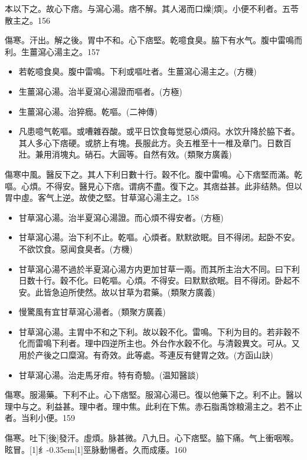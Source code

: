 \documentclass[11pt,oneside,b5paper]{ctexbook}
\begin{document}
\begin{flushleft}
本以下之。故心下痞。与瀉心湯。痞不解。其人渴而口燥[煩]。小便不利者。五苓散主之。156

傷寒。汗出。解之後。胃中不和。心下痞堅。乾噫食臭。脇下有水气。腹中雷鳴而利。生薑瀉心湯主之。157

\begin{itemize}
\item 若乾噫食臭。腹中雷鳴。下利或嘔吐者。生薑瀉心湯主之。(方機)
\item 生薑瀉心湯。治半夏瀉心湯證而嘔者。(方極)
\item 生薑瀉心湯。治猝癇。乾嘔。(二神傳)
\item 凡患噫气乾嘔。或嘈雜吞酸。或平日饮食每觉惡心煩闷。水饮升降於脇下者。其人多心下痞硬。或脐上有塊。長服此方。灸五椎至十一椎及章门。日数百壯。兼用消塊丸。硝石。大圓等。自然有效。(類聚方廣義)
\end{itemize}

傷寒中風。醫反下之。其人下利日數十行。穀不化。腹中雷鳴。心下痞堅而滿。乾嘔。心煩。不得安。醫見心下痞。谓病不盡。復下之。其痞益甚。此非结熱。但以胃中虛。客气上逆。故使之堅。甘草瀉心湯主之。158

\begin{itemize}
\item 甘草瀉心湯。治半夏瀉心湯證。而心煩不得安者。(方極)
\item 甘草瀉心湯。治下利不止。乾嘔。心煩者。默默欲眠。目不得闭。起卧不安。不欲饮食。惡闻食臭者。(方機)
\item 甘草瀉心湯不過於半夏瀉心湯方内更加甘草一兩。而其所主治大不同。曰下利日数十行。穀不化。曰乾嘔。心煩。不得安。曰默默欲眠。目不得闭。卧起不安。此皆急迫所使然。故以甘草为君藥。(類聚方廣義)
\item 慢驚風有宜甘草瀉心湯者。(類聚方廣義)
\item 甘草瀉心湯。主胃中不和之下利。故以穀不化。雷鳴。下利为目的。若非穀不化而雷鳴下利者。理中四逆所主也。外台作水穀不化。与清穀異文。可从。又用於产後之口糜瀉。有奇效。此等處。芩連反有健胃之效。(方函山訣)
\item 甘草瀉心湯。治走馬牙疳。特有奇驗。(温知醫談)
\end{itemize}

傷寒。服湯藥。下利不止。心下痞堅。服瀉心湯已。復以他藥下之。利不止。醫以理中与之。利益甚。理中者。理中焦。此利在下焦。赤石脂禹馀粮湯主之。若不止者。当利小便。159

傷寒。吐下[後]發汗。虛煩。脉甚微。八九日。心下痞堅。脇下痛。气上衝咽喉。眩冒。{\hbox{\scalebox{0.68}[1]{纟}\kern-0.35em\scalebox{0.64}[1]{巠}}}脉動愓者。久而成痿。160


\end{flushleft}
\end{document}
